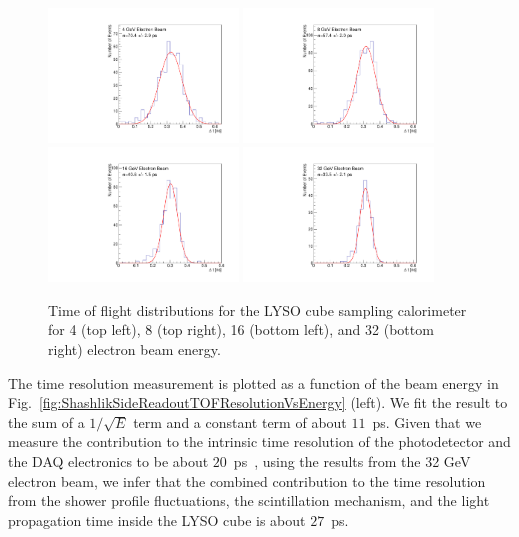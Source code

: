 \begin{figure}[H] \centering
\includegraphics[width=0.45\textwidth]{figs/timing/TOF_Electron_LYSOCube_4GeV} 
\includegraphics[width=0.45\textwidth]{figs/timing/TOF_Electron_LYSOCube_8GeV} \\
\includegraphics[width=0.45\textwidth]{figs/timing/TOF_Electron_LYSOCube_16GeV} 
\includegraphics[width=0.45\textwidth]{figs/timing/TOF_Electron_LYSOCube_32GeV} 
\caption{  Time of flight distributions for the LYSO cube sampling calorimeter
for 4 \GeV (top left), 8 \GeV (top right), 16 \GeV (bottom left), and 32 \GeV (bottom right) electron beam energy. } 
\label{fig:LYSOCubeTOF}
\end{figure}

The time resolution measurement is plotted as a function of the
beam energy in Fig.~\ref{fig:ShashlikSideReadoutTOFResolutionVsEnergy} (left). We fit the result to the sum of a 
$1/\sqrt{E}$ term and a constant term of about $11$~\unit{ps}.   Given that we measure the contribution 
to the intrinsic time resolution of the photodetector and the DAQ electronics to be about 
$20$~\unit{ps}~\cite{MCPFastCaloNIMA}, using the results from the 32 GeV electron beam, we infer 
that the combined contribution to the time resolution from the shower profile
fluctuations, the scintillation mechanism, and the light propagation time inside the
LYSO cube is about $27$~\unit{ps}.  

